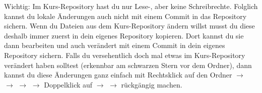 Wichtig: Im Kurs-Repository hast du nur Lese-, aber keine Schreibrechte.
Folglich kannst du lokale Änderungen auch nicht mit einem Commit in das
Repository sichern. Wenn du Dateien aus dem Kurs-Repository ändern willst musst
du diese deshalb immer zuerst in dein eigenes Repository kopieren. Dort kannst
du sie dann bearbeiten und auch verändert mit einem Commit in dein eigenes
Repository sichern. Falls du versehentlich doch mal etwas im Kurs-Repository
verändert haben solltest (erkennbar am schwarzen Stern vor dem Ordner), dann
kannst du diese Änderungen ganz einfach mit Rechtsklick auf den
Ordner $\rightarrow$  $\rightarrow$ 
$\rightarrow$  $\rightarrow$
Doppelklick auf  $\rightarrow$ 
$\rightarrow$  rückgängig machen.


% 
% 
% 
% 
% 


